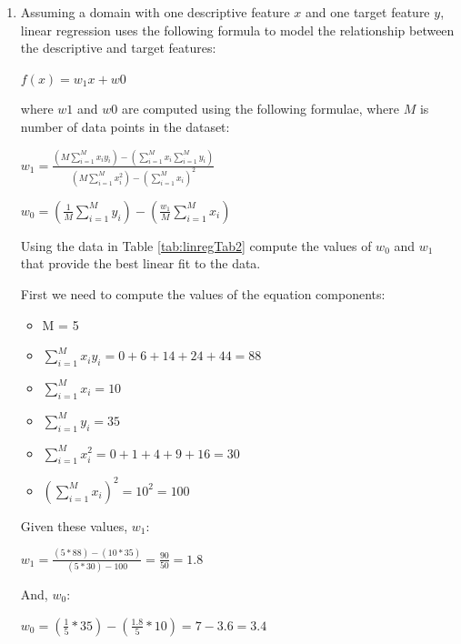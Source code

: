 \documentclass[solution]{ditpaper}
\begin{document}
\question 
	\begin{enumerate}
		\item Assuming a domain with one descriptive feature $x$ and one target feature $y$, linear regression uses the following formula to model the relationship between the descriptive and target features: 
	\begin{center}
		$\displaystyle f(x) = w_1x + w0$
	\end{center}
where $w1$ and $w0$ are computed using the following formulae, where $M$ is number of data points in the dataset:
	\begin{center}
		$\displaystyle w_1 =  \frac{(M \sum_{i=1}^M x_i y_i) - (\sum_{i=1}^{M} x_i \sum_{i=1}^{M} y_i)} {(M \sum_{i=1}^{M} x_i^2) - (\sum_{i=1}^{M} x_i)^2}$
	\end{center}
	\begin{center}
		$\displaystyle w_0 = (\frac{1}{M} \sum_{i=1}^{M} y_i) - (\frac{w_1}{M} \sum_{i=1}^{M} x_i)$
	\end{center}
Using the data in Table \ref{tab:linregTab2} compute the values of $w_0$ and $w_1$ that provide the best linear fit to the data.
			\begin{answer}
				First we need to compute the values of the equation components:
			\begin{itemize}
				\item M = 5
				\item $\sum_{i=1}^{M} x_i y_i = 0 + 6 + 14 + 24 + 44 = 88$
				\item $\sum_{i=1}^{M} x_i = 10$
			   	\item $\sum_{i=1}^{M} y_i = 35$
			  	\item $\sum_{i=1}^{M} x_i^2 = 0 + 1 + 4 + 9 + 16 = 30$
			  	\item $(\sum_{i=1}^{M} x_i)^2 = 10^2 = 100$
			\end{itemize}
				Given these values,  $w_1$:
				\begin{center}
					\textbf{$w_1= \frac{(5*88)-(10*35)}{(5*30)-100} = \frac{90}{50}=1.8$}
				\end{center}
				And, $w_0$:
				\begin{center}
				\textbf{$w_0= (\frac{1}{5}*35) - (\frac{1.8}{5}*10)= 7-3.6=3.4$}
			\end{center}
			\end{answer}
		

\end{enumerate}
\end{document}
